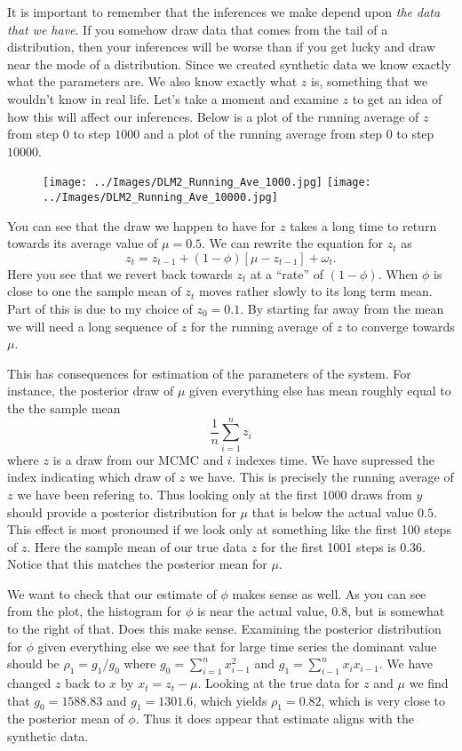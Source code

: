 \documentclass{article}
\begin{document}
It is important to remember that the inferences we make depend upon \emph{the data that we have}.  If you somehow draw data that comes from the tail of a distribution, then your inferences will be worse than if you get lucky and draw near the mode of a distribution.  Since we created synthetic data we know exactly what the parameters are.  We also know exactly what $z$ is, something that we wouldn't know in real life.  Let's take a moment and examine $z$ to get an idea of how this will affect our inferences.  Below is a plot of the running average of $z$ from step $0$ to step $1000$ and a plot of the running average from step $0$ to step $10000$.

\begin{figure}[!h]
\begin{center}
\texttt{[image: ../Images/DLM2\_Running\_Ave\_1000.jpg]}
\texttt{[image: ../Images/DLM2\_Running\_Ave\_10000.jpg]}
\end{center}
\end{figure}

You can see that the draw we happen to have for $z$ takes a long time to return towards its average value of $\mu = 0.5$.  We can rewrite the equation for $z_t$ as
\[
z_{t} = z_{t-1} + (1 - \phi) [\mu - z_{t-1}] + \omega_t.
\]
Here you see that we revert back towards $z_t$ at a ``rate'' of $(1-\phi)$.  When $\phi$ is close to one the sample mean of $z_t$ moves rather slowly to its long term mean.  Part of this is due to my choice of $z_0 = 0.1$.  By starting far away from the mean we will need a long sequence of $z$ for the running average of $z$ to converge towards $\mu$.

This has consequences for estimation of the parameters of the system.  For instance, the posterior draw of $\mu$ given everything else has mean roughly equal to the the sample mean
\[
\frac{1}{n} \sum_{i=1}^n z_i
\]
where $z$ is a draw from our MCMC and $i$ indexes time.  We have supressed the index indicating which draw of $z$ we have.  This is precisely the running average of $z$ we have been refering to.  Thus looking only at the first $1000$ draws from $y$ should provide a posterior distribution for $\mu$ that is below the actual value $0.5$.  This effect is most pronouned if we look only at something like the first 100 steps of $z$.  Here the sample mean of our true data $z$ for the first 1001 steps is $0.36$.  Notice that this matches the posterior mean for $\mu$.

We want to check that our estimate of $\phi$ makes sense as well.  As you can see from the plot, the histogram for $\phi$ is near the actual value, $0.8$, but is somewhat to the right of that.  Does this make sense.  Examining the posterior distribution for $\phi$ given everything else we see that for large time series the dominant value should be $\rho_1 = g_1/g_0$ where $g_0 = \sum_{i=1}^n x_{i-1}^2$ and $g_1 = \sum_{i-1}^n x_i x_{i-1}$.  We have changed $z$ back to $x$ by $x_t = z_t - \mu$.  Looking at the true data for $z$ and $\mu$ we find that $g_0 = 1588.83$ and $g_1 = 1301.6$, which yields $\rho_1 = 0.82$, which is very close to the posterior mean of $\phi$.  Thus it does appear that estimate aligns with the synthetic data.
\end{document}
